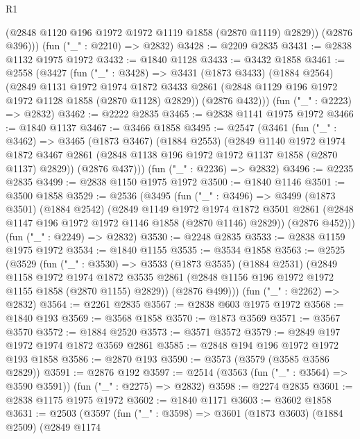 \begin{lexlean}{R1}
\begin{coremodule}
          (@2848 @1120 @196 @1972 @1972 @1119 @1858 (@2870 @1119) @2829))
        (@2876 @396)))
    (fun ("_" : @2210) => @2832)
@3428 := @2209 @2835
@3431 := @2838 @1132 @1975 @1972
@3432 := @1840 @1128
@3433 := @3432 @1858
@3461 := @2558
    (@3427
      (fun ("_" : @3428) =>
      @3431
        (@1873 @3433)
        (@1884 @2564)
        (@2849
          @1131
          @1972
          @1974
          @1872
          @3433
          @2861
          (@2848 @1129 @196 @1972 @1972 @1128 @1858 (@2870 @1128) @2829))
        (@2876 @432)))
    (fun ("_" : @2223) => @2832)
@3462 := @2222 @2835
@3465 := @2838 @1141 @1975 @1972
@3466 := @1840 @1137
@3467 := @3466 @1858
@3495 := @2547
    (@3461
      (fun ("_" : @3462) =>
      @3465
        (@1873 @3467)
        (@1884 @2553)
        (@2849
          @1140
          @1972
          @1974
          @1872
          @3467
          @2861
          (@2848 @1138 @196 @1972 @1972 @1137 @1858 (@2870 @1137) @2829))
        (@2876 @437)))
    (fun ("_" : @2236) => @2832)
@3496 := @2235 @2835
@3499 := @2838 @1150 @1975 @1972
@3500 := @1840 @1146
@3501 := @3500 @1858
@3529 := @2536
    (@3495
      (fun ("_" : @3496) =>
      @3499
        (@1873 @3501)
        (@1884 @2542)
        (@2849
          @1149
          @1972
          @1974
          @1872
          @3501
          @2861
          (@2848 @1147 @196 @1972 @1972 @1146 @1858 (@2870 @1146) @2829))
        (@2876 @452)))
    (fun ("_" : @2249) => @2832)
@3530 := @2248 @2835
@3533 := @2838 @1159 @1975 @1972
@3534 := @1840 @1155
@3535 := @3534 @1858
@3563 := @2525
    (@3529
      (fun ("_" : @3530) =>
      @3533
        (@1873 @3535)
        (@1884 @2531)
        (@2849
          @1158
          @1972
          @1974
          @1872
          @3535
          @2861
          (@2848 @1156 @196 @1972 @1972 @1155 @1858 (@2870 @1155) @2829))
        (@2876 @499)))
    (fun ("_" : @2262) => @2832)
@3564 := @2261 @2835
@3567 := @2838 @603 @1975 @1972
@3568 := @1840 @193
@3569 := @3568 @1858
@3570 := @1873 @3569
@3571 := @3567 @3570
@3572 := @1884 @2520
@3573 := @3571 @3572
@3579 := @2849 @197 @1972 @1974 @1872 @3569 @2861
@3585 := @2848 @194 @196 @1972 @1972 @193 @1858
@3586 := @2870 @193
@3590 := @3573 (@3579 (@3585 @3586 @2829))
@3591 := @2876 @192
@3597 := @2514 (@3563 (fun ("_" : @3564) => @3590 @3591)) (fun ("_" : @2275) => @2832)
@3598 := @2274 @2835
@3601 := @2838 @1175 @1975 @1972
@3602 := @1840 @1171
@3603 := @3602 @1858
@3631 := @2503
    (@3597
      (fun ("_" : @3598) =>
      @3601
        (@1873 @3603)
        (@1884 @2509)
        (@2849
          @1174

\end{coremodule}
\end{lexlean}

